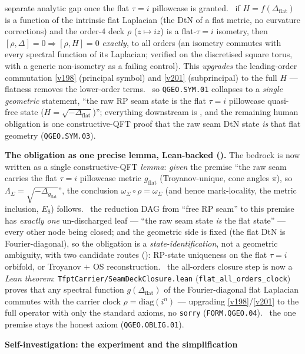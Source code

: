 \documentclass[11pt,a4paper]{article}
\begin{document}
\begin{keybox}
separate analytic gap once the flat $\tau{=}i$ pillowcase is granted. \mE\ if $H=f(\Delta_{\mathrm{flat}})$ is a
function of the intrinsic flat Laplacian (the DtN of a flat metric, no curvature corrections) and the order-$4$
deck $\rho$ ($z\mapsto iz$) is a flat-$\tau{=}i$ isometry, then $[\rho,\Delta]{=}0\Rightarrow[\rho,H]{=}0$
\emph{exactly}, to all orders (an isometry commutes with every spectral function of its Laplacian; verified on
the discretised square torus, with a generic non-isometry as a failing control). This \emph{upgrades} the
leading-order commutation \vref{v198} (principal symbol) and \vref{v201} (subprincipal) to the full $H$ ---
flatness removes the lower-order terms. \mO\ so \texttt{QGEO.SYM.01} collapses to a \emph{single geometric}
statement, ``the raw RP seam state is the flat $\tau{=}i$ pillowcase quasi-free state ($H{=}\sqrt{-\Delta_{\mathrm{flat}}}$)'';
everything downstream is \mE, and the remaining human obligation is one constructive-QFT proof that the raw seam
DtN state \emph{is} that flat geometry (\texttt{QGEO.SYM.03}).
\par\smallskip\noindent\textbf{The obligation as one precise lemma, Lean-backed ().}
The bedrock is now written as a single constructive-QFT \emph{lemma}: \emph{given} the premise ``the raw seam
carries the flat $\tau{=}i$ pillowcase metric $g_{\mathrm{flat}}$ (Troyanov-unique, cone angles $\pi$), so
$\Lambda_\Sigma=\sqrt{-\Delta_{g_{\mathrm{flat}}}}$'', the conclusion $\omega_\Sigma\circ\rho=\omega_\Sigma$ (and
hence mark-locality, the metric inclusion, $E_8$) follows. \mE\ the reduction DAG from ``free RP seam'' to this
premise has \emph{exactly one} un-discharged leaf --- ``the raw seam state \emph{is} the flat state'' --- every
other node being closed; and the geometric side is fixed (the flat DtN is Fourier-diagonal), so the obligation is
a \emph{state-identification}, not a geometric ambiguity, with two candidate routes (\mC): RP-state uniqueness on
the flat $\tau{=}i$ orbifold, or Troyanov $+$ OS reconstruction. \mE\ the all-orders closure step is now a
\emph{Lean theorem}: \texttt{TfptCarrier/SeamDeckClosure.lean} (\texttt{flat\_all\_orders\_clock}) proves that any
spectral function $g(\Delta_{\mathrm{flat}})$ of the Fourier-diagonal flat Laplacian commutes with the carrier
clock $\rho=\mathrm{diag}(i^n)$ --- upgrading \vref{v198}/\vref{v201} to the full operator with only the standard
axioms, no \texttt{sorry} (\texttt{FORM.QGEO.04}). \mO\ the one premise stays the honest axiom
(\texttt{QGEO.OBLIG.01}).
\par\smallskip\noindent\textbf{Self-investigation: the experiment and the simplification
}
\end{keybox}
\end{document}
